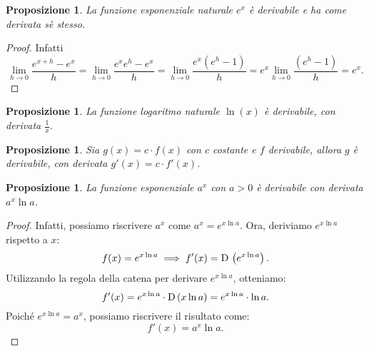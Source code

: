 \documentclass{article}
\theoremstyle{plain}
\newtheorem{prop}[thm]{Proposizione}
\theoremstyle{definition}
\theoremstyle{remark}
\begin{document}
\vspace{10pt}

\begin{bxthm}
\begin{prop}
    La funzione esponenziale naturale $e^x$ è derivabile e ha come derivata sè stesso.
\end{prop}
\end{bxthm}
\begin{proof}
    Infatti
    \[\lim_{h\to0}\dfrac{e^{x+h}-e^x}{h}=\lim_{h\to0}\dfrac{e^xe^h-e^x}{h}=\lim_{h\to0}\dfrac{e^x(e^h-1)}{h}=e^x\lim_{h\to0}\dfrac{(e^h-1)}{h}=e^x.\]
\end{proof}

\vspace{10pt}

\begin{bxthm}
\begin{prop}
    La funzione logaritmo naturale $\ln(x)$ è derivabile, con derivata $\frac{1}{x}$.
\end{prop}
\end{bxthm}

\vspace{10pt}

\begin{bxthm}
\begin{prop}
    Sia $g(x)=c\cdot f(x)$ con $c$ costante e $f$ derivabile, allora $g$ è derivabile, con derivata $g'(x)=c\cdot f'(x)$.
\end{prop}
\end{bxthm}

\vspace{10pt}

\begin{bxthm}
\begin{prop}
    La funzione esponenziale $a^x$ con $a>0$ è derivabile con derivata $a^x\ln a$.
\end{prop}
\end{bxthm}
\begin{proof}
    Infatti, possiamo riscrivere $a^x$ come $a^x = e^{x \ln a}$. 
    Ora, deriviamo $e^{x \ln a}$ rispetto a $x$:
    \[
    f(x) = e^{x \ln a} \implies f'(x) = \textup{D}\, \left( e^{x \ln a} \right).
    \]
    Utilizzando la regola della catena per derivare $e^{x \ln a}$, otteniamo:
    \[
    f'(x) = e^{x \ln a} \cdot \textup{D}\, (x \ln a) = e^{x \ln a} \cdot \ln a.
    \]
    Poiché $e^{x \ln a} = a^x$, possiamo riscrivere il risultato come:
    \[
    f'(x) = a^x \ln a.
    \]
\end{proof}
\end{document}
